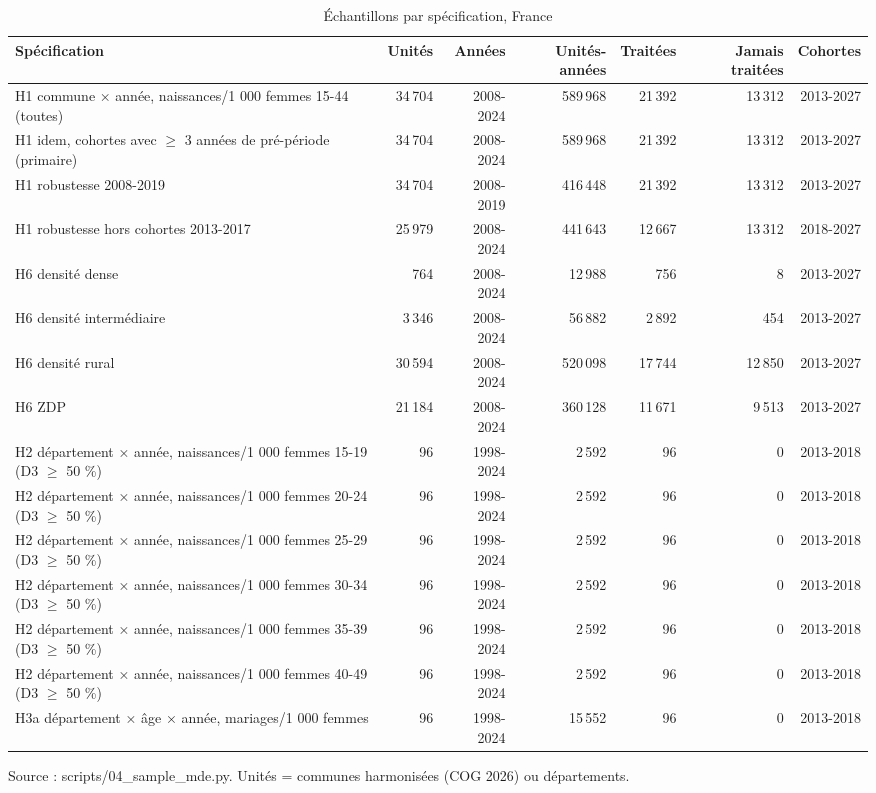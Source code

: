 \begin{table}[htbp]\centering
\begin{threeparttable}
\caption{Échantillons par spécification, France}\label{tab:sample}
\footnotesize
\begin{tabular}{p{4.3cm}rrrrrr}
\toprule
Spécification & Unités & Années & Unités-années & Traitées & Jamais traitées & Cohortes \\
\midrule
H1 commune × année, naissances/1 000 femmes 15-44 (toutes) & 34\,704 & 2008-2024 & 589\,968 & 21\,392 & 13\,312 & 2013-2027 \\
H1 idem, cohortes avec $\geq$ 3 années de pré-période (primaire) & 34\,704 & 2008-2024 & 589\,968 & 21\,392 & 13\,312 & 2013-2027 \\
H1 robustesse 2008-2019 & 34\,704 & 2008-2019 & 416\,448 & 21\,392 & 13\,312 & 2013-2027 \\
H1 robustesse hors cohortes 2013-2017 & 25\,979 & 2008-2024 & 441\,643 & 12\,667 & 13\,312 & 2018-2027 \\
H6 densité dense & 764 & 2008-2024 & 12\,988 & 756 & 8 & 2013-2027 \\
H6 densité intermédiaire & 3\,346 & 2008-2024 & 56\,882 & 2\,892 & 454 & 2013-2027 \\
H6 densité rural & 30\,594 & 2008-2024 & 520\,098 & 17\,744 & 12\,850 & 2013-2027 \\
H6 ZDP & 21\,184 & 2008-2024 & 360\,128 & 11\,671 & 9\,513 & 2013-2027 \\
H2 département × année, naissances/1 000 femmes 15-19 (D3 $\geq$ 50 \%) & 96 & 1998-2024 & 2\,592 & 96 & 0 & 2013-2018 \\
H2 département × année, naissances/1 000 femmes 20-24 (D3 $\geq$ 50 \%) & 96 & 1998-2024 & 2\,592 & 96 & 0 & 2013-2018 \\
H2 département × année, naissances/1 000 femmes 25-29 (D3 $\geq$ 50 \%) & 96 & 1998-2024 & 2\,592 & 96 & 0 & 2013-2018 \\
H2 département × année, naissances/1 000 femmes 30-34 (D3 $\geq$ 50 \%) & 96 & 1998-2024 & 2\,592 & 96 & 0 & 2013-2018 \\
H2 département × année, naissances/1 000 femmes 35-39 (D3 $\geq$ 50 \%) & 96 & 1998-2024 & 2\,592 & 96 & 0 & 2013-2018 \\
H2 département × année, naissances/1 000 femmes 40-49 (D3 $\geq$ 50 \%) & 96 & 1998-2024 & 2\,592 & 96 & 0 & 2013-2018 \\
H3a département × âge × année, mariages/1 000 femmes & 96 & 1998-2024 & 15\,552 & 96 & 0 & 2013-2018 \\
\bottomrule
\end{tabular}
\begin{tablenotes}\footnotesize
\item Source : scripts/04\_sample\_mde.py. Unités = communes harmonisées (COG 2026) ou départements.
\end{tablenotes}
\end{threeparttable}
\end{table}
